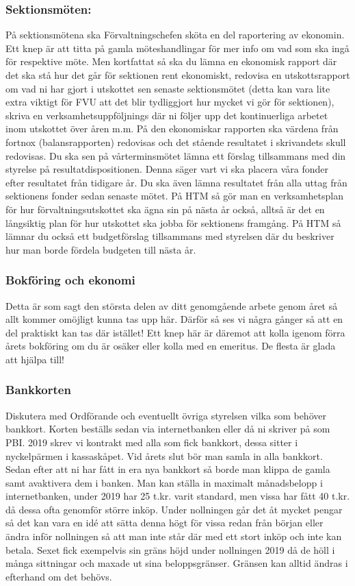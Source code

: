 \documentclass[10pt]{article}
\begin{document}
\subsubsection{Sektionsmöten:}
På sektionsmötena ska Förvaltningschefen sköta en del raportering av ekonomin. Ett knep är att titta på gamla möteshandlingar för mer info om vad som ska ingå för respektive möte. Men kortfattat så ska du lämna en ekonomisk rapport där det ska stå hur det går för sektionen rent ekonomiskt, redovisa en utskottsrapport om vad ni har gjort i utskottet sen senaste sektionsmötet (detta kan vara lite extra viktigt för FVU att det blir tydliggjort hur mycket vi gör för sektionen), skriva en verksamhetsuppföljnings där ni följer upp det kontinuerliga arbetet inom utskottet över åren m.m. 
På den ekonomiskar rapporten ska värdena från fortnox (balansrapporten) redovisas och det stående resultatet i skrivandets skull redovisas.
Du ska sen på vårterminsmötet lämna ett förslag tillsammans med din styrelse på resultatdispositionen. Denna säger vart vi ska placera våra fonder efter resultatet från tidigare år.
Du ska även lämna resultatet från alla uttag från sektionens fonder sedan senaste mötet.
På HTM så gör man en verksamhetsplan för hur förvaltningsutskottet ska ägna sin på nästa år också, alltså är det en långsiktig plan för hur utskottet ska jobba för sektionens framgång.
På HTM så lämnar du också ett budgetförslag tillsammans med styrelsen där du beskriver hur man borde fördela budgeten till nästa år.

\subsubsection{Bokföring och ekonomi}
Detta är som sagt den största delen av ditt genomgående arbete genom året så allt kommer omöjligt kunna tas upp här. Därför så ses vi några gånger så att en del praktiskt kan tas där istället! 
Ett knep här är däremot att kolla igenom förra årets bokföring om du är osäker eller kolla med en emeritus. De flesta är glada att hjälpa till!

\subsubsection{Bankkorten}
Diskutera med Ordförande och eventuellt övriga styrelsen vilka som behöver bankkort. Korten beställs sedan via internetbanken eller då ni skriver på som PBI. 2019 skrev vi kontrakt med alla som fick bankkort, dessa sitter i nyckelpärmen i kassaskåpet. Vid årets slut bör man samla in alla bankkort. Sedan efter att ni har fått in era nya bankkort så borde man klippa de gamla samt avaktivera dem i banken.
Man kan ställa in maximalt månadsbelopp i internetbanken, under 2019 har 25 t.kr. varit standard, men vissa har fått 40 t.kr. då dessa ofta genomför större inköp. 
Under nollningen går det åt mycket pengar så det kan vara en idé att sätta denna högt för vissa redan från början eller ändra inför nollningen så att man inte står där med ett stort inköp och inte kan betala. 
Sexet fick exempelvis sin gräns höjd under nollningen 2019 då de höll i många sittningar och maxade ut sina beloppsgränser. Gränsen kan alltid ändras i efterhand om det behövs. 
\end{document}
